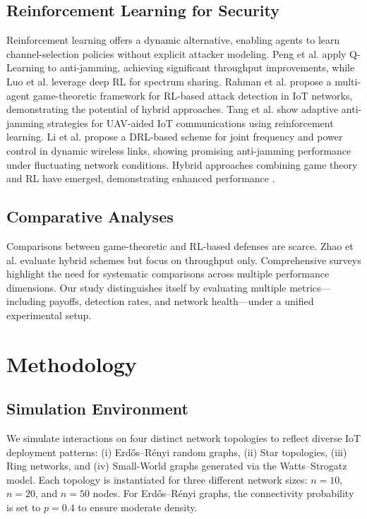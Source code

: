 \documentclass[conference]{IEEEtran}
\begin{document}
\subsection{Reinforcement Learning for Security}
Reinforcement learning offers a dynamic alternative, enabling agents to learn channel-selection policies without explicit attacker modeling. Peng et al. \cite{peng2017anti} apply Q-Learning to anti-jamming, achieving significant throughput improvements, while Luo et al. \cite{luo2018anti} leverage deep RL for spectrum sharing. Rahman et al. \cite{rahman2023rlbased} propose a multi-agent game-theoretic framework for RL-based attack detection in IoT networks, demonstrating the potential of hybrid approaches. Tang et al. \cite{tang2024adaptive} show adaptive anti-jamming strategies for UAV-aided IoT communications using reinforcement learning. Li et al. \cite{li2022drl} propose a DRL-based scheme for joint frequency and power control in dynamic wireless links, showing promising anti-jamming performance under fluctuating network conditions. Hybrid approaches combining game theory and RL have emerged, demonstrating enhanced performance \cite{zhao2020hybrid,li2021game}.

\subsection{Comparative Analyses}
Comparisons between game-theoretic and RL-based defenses are scarce. Zhao et al. \cite{zhao2020hybrid} evaluate hybrid schemes but focus on throughput only. Comprehensive surveys \cite{survey2022jamming} highlight the need for systematic comparisons across multiple performance dimensions. Our study distinguishes itself by evaluating multiple metrics—including payoffs, detection rates, and network health—under a unified experimental setup.


\section{Methodology}

\subsection{Simulation Environment}
We simulate interactions on four distinct network topologies to reflect diverse IoT deployment patterns: (i) Erd\H{o}s--R\'enyi random graphs, (ii) Star topologies, (iii) Ring networks, and (iv) Small-World graphs generated via the Watts–Strogatz model. Each topology is instantiated for three different network sizes: $n = 10$, $n = 20$, and $n = 50$ nodes. For Erd\H{o}s--R\'enyi graphs, the connectivity probability is set to $p=0.4$ to ensure moderate density.
\end{document}
